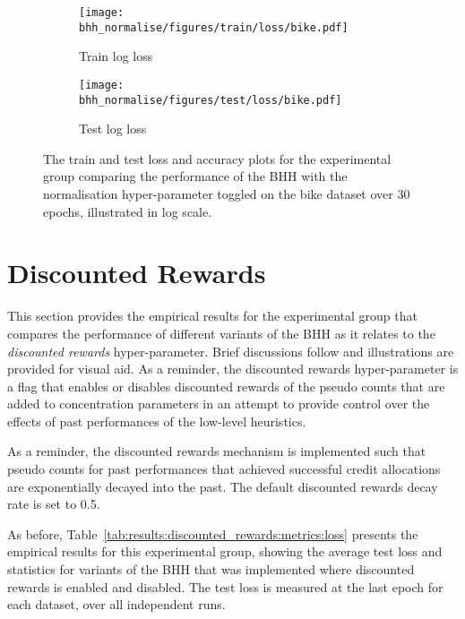 \begin{figure}[htbp]
      \begin{subfigure}{0.5\textwidth}
            \centering
            \texttt{[image: bhh\_normalise/figures/train/loss/bike.pdf]}
            \caption{Train log loss}
            \label{fig:results:normalise:figures:loss:train:bike}
      \end{subfigure}
      \begin{subfigure}{0.5\textwidth}
            \centering
            \texttt{[image: bhh\_normalise/figures/test/loss/bike.pdf]}
            \caption{Test log loss}
            \label{fig:results:normalise:figures:loss:test:bike}
      \end{subfigure}
      \par\bigskip
      \caption{The train and test loss and accuracy plots for the experimental group comparing the performance of the \acs{BHH} with the normalisation hyper-parameter toggled on the bike dataset over 30 epochs, illustrated in log scale.}
      \label{fig:results:normalise:figures:bike}
\end{figure}


\section{Discounted Rewards}\label{sec:results:discounted_rewards}

This section provides the empirical results for the experimental group that compares the performance of different variants of the \acs{BHH} as it relates to the \textit{discounted rewards} hyper-parameter. Brief discussions follow and illustrations are provided for visual aid. As a reminder, the discounted rewards hyper-parameter is a flag that enables or disables discounted rewards of the pseudo counts that are added to concentration parameters in an attempt to provide control over the effects of past performances of the low-level heuristics.

As a reminder, the discounted rewards mechanism is implemented such that pseudo counts for past performances that achieved successful credit allocations are exponentially decayed into the past. The default discounted rewards decay rate is set to 0.5.

As before, Table~\ref{tab:results:discounted_rewards:metrics:loss} presents the empirical results for this experimental group, showing the average test loss and statistics for variants of the \acs{BHH} that was implemented where discounted rewards is enabled and disabled. The test loss is measured at the last epoch for each dataset, over all independent runs.

